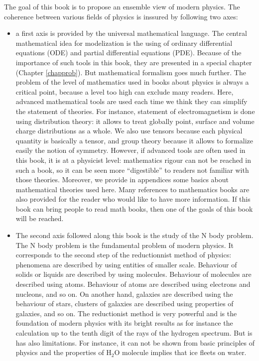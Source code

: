 \documentclass[12pt]{book}
\begin{document}
The goal of this book is to propose an ensemble view of modern physics. The
coherence between various fields of physics is inssured by following two axes:
\begin{itemize}
\item a first axis is provided by the universal mathematical language. The
  central mathematical idea for modelization is the using of ordinary
  differential equations (ODE) and partial differential equations
  (PDE). Because of the importance of such tools in this book, they are
  presented in a special chapter (Chapter \ref{chapprob}). But mathematical
  formalism goes much further. The problem of the 
  level of mathematics used in books about physics is always a critical point,
  because a level too high can exclude many readers. Here, 
advanced mathematical tools are used each time we think they can simplify the 
statement of theories. For instance, statement of electromagnetism is done
using distribution theory: it allows to treat globally point, surface and
volume charge distributions as a whole. We also use tensors because each
physical quantity is basically a tensor, and group theory because it allows to
formalize easily the notion of symmetry. 
However, if advanced tools are often
used in this book, it is at a physicist level: mathematics rigour can not be
reached in such a book, so it can be seen  more ``digestible'' to readers
not familiar with those theories. Moreover, we provide in appendices some
basics about mathematical theories used here. Many references to mathematics
books are also provided for the reader who would like to have more
information. If this book can bring people to read math books, then one of the
goals of this book will be reached.
\item The second axis followed along this book is the study of the N body
  problem. The N 
body problem is the fundamental problem of modern physics. It corresponds to
the second step of the reductionnist method of physics: phenomena are
  described by using entities of 
smaller scale. Behaviour of solids or liquids are described by using
molecules. Behaviour of molecules are described using atoms. Behaviour of
atoms are described using electrons and nucleons, and so on. On another hand,
galaxies are described using the behaviour of stars, clusters of galaxies are
described using properties of galaxies, and so on.
The reductionist method is very powerful and is the foundation of modern
physics with its bright results as for instance the calculation up to the
tenth digit of the rays of the hydrogen spectrum. But is has also limitations.
For instance, it can not be shown from basic principles of physics and the
properties of H$_2$O molecule implies that ice fleets on water.
\end{itemize}
\end{document}
